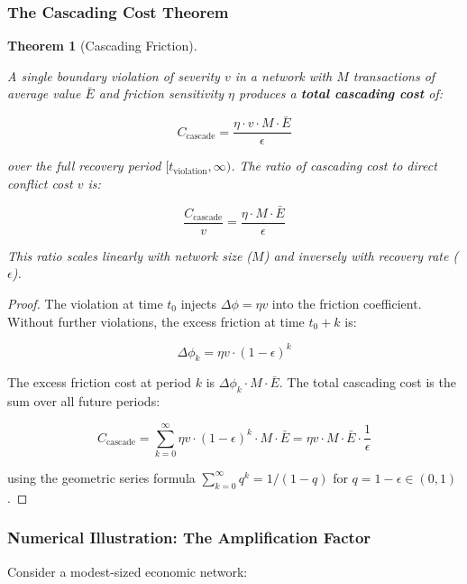 \documentclass[11pt]{article}
\theoremstyle{plain}
\newtheorem{theorem}{Theorem}
\theoremstyle{definition}
\theoremstyle{remark}
\let\origsubsubsection\subsubsection
\renewcommand{\subsubsection}{\needspace{4\baselineskip}\origsubsubsection}
\begin{document}
\subsubsection{The Cascading Cost
Theorem}\label{the-cascading-cost-theorem}

\begin{theorem}[Cascading Friction]
\label{thm-cascading-friction}

A single boundary violation of severity $v$ in a network with $M$ transactions of average value $\bar{E}$ and friction sensitivity $\eta$ produces a \textbf{total cascading cost} of:

$$C_{\text{cascade}} = \frac{\eta \cdot v \cdot M \cdot \bar{E}}{\epsilon}$$

over the full recovery period $[t_{\text{violation}}, \infty)$. The ratio of cascading cost to direct conflict cost $v$ is:

$$\frac{C_{\text{cascade}}}{v} = \frac{\eta \cdot M \cdot \bar{E}}{\epsilon}$$

This ratio scales linearly with network size ($M$) and inversely with recovery rate ($\epsilon$).
\end{theorem}

\begin{proof}
The violation at time $t_0$ injects $\Delta\phi = \eta v$ into the friction coefficient. Without further violations, the excess friction at time $t_0 + k$ is:

$$\Delta\phi_k = \eta v \cdot (1 - \epsilon)^k$$

The excess friction cost at period $k$ is $\Delta\phi_k \cdot M \cdot \bar{E}$. The total cascading cost is the sum over all future periods:

$$C_{\text{cascade}} = \sum_{k=0}^{\infty} \eta v \cdot (1 - \epsilon)^k \cdot M \cdot \bar{E} = \eta v \cdot M \cdot \bar{E} \cdot \frac{1}{\epsilon}$$

using the geometric series formula $\sum_{k=0}^{\infty} q^k = 1/(1-q)$ for $q = 1 - \epsilon \in (0, 1)$.
\end{proof}

\subsubsection{Numerical Illustration: The Amplification
Factor}\label{numerical-illustration-the-amplification-factor}

Consider a modest-sized economic network:
\end{document}
